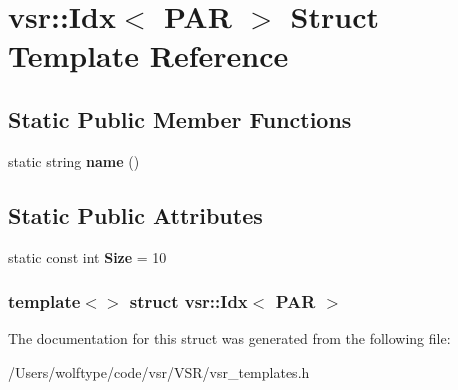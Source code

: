 \hypertarget{structvsr_1_1_idx_3_01_p_a_r_01_4}{\section{vsr\-:\-:Idx$<$ P\-A\-R $>$ Struct Template Reference}
\label{structvsr_1_1_idx_3_01_p_a_r_01_4}
}
\subsection*{Static Public Member Functions}
\begin{DoxyCompactItemize}
\item 
\hypertarget{structvsr_1_1_idx_3_01_p_a_r_01_4_adff59d36063e7ea52e19a8acf7b52e21}{static string {\bfseries name} ()}\label{structvsr_1_1_idx_3_01_p_a_r_01_4_adff59d36063e7ea52e19a8acf7b52e21}

\end{DoxyCompactItemize}
\subsection*{Static Public Attributes}
\begin{DoxyCompactItemize}
\item 
\hypertarget{structvsr_1_1_idx_3_01_p_a_r_01_4_a907aca2f2e5b85c9eb33181ef04cfd3d}{static const int {\bfseries Size} = 10}\label{structvsr_1_1_idx_3_01_p_a_r_01_4_a907aca2f2e5b85c9eb33181ef04cfd3d}

\end{DoxyCompactItemize}
\subsubsection*{template$<$$>$ struct vsr\-::\-Idx$<$ P\-A\-R $>$}



The documentation for this struct was generated from the following file\-:\begin{DoxyCompactItemize}
\item 
/\-Users/wolftype/code/vsr/\-V\-S\-R/vsr\-\_\-templates.\-h\end{DoxyCompactItemize}
